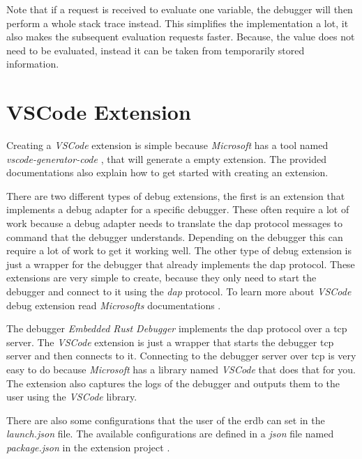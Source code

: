 Note that if a request is received to evaluate one variable, the debugger will then perform a whole stack trace instead.
This simplifies the implementation a lot, it also makes the subsequent evaluation requests faster.
Because, the value does not need to be evaluated, instead it can be taken from temporarily stored information.



\section{VSCode Extension}
Creating a \emph{VSCode} extension is simple because \emph{Microsoft} has a tool named \emph{vscode-generator-code} \cite{vscode-generator-code}, that will generate a empty extension.
The provided documentations also explain how to get started with creating an extension.


There are two different types of debug extensions, the first is an extension that implements a debug adapter for a specific debugger.
These often require a lot of work because a debug adapter needs to translate the \gls{dap} protocol messages to command that the debugger understands.
Depending on the debugger this can require a lot of work to get it working well.
The other type of debug extension is just a wrapper for the debugger that already implements the \gls{dap} protocol.
These extensions are very simple to create, because they only need to start the debugger and connect to it using the \emph{dap} protocol.
To learn more about \emph{VSCode} debug extension read \emph{Microsofts} documentations \cite{vscode-debugger-extension-doc}.


The debugger \emph{Embedded Rust Debugger} implements the \gls{dap} protocol over a \gls{tcp} server.
The \emph{VSCode} extension is just a wrapper that starts the debugger \gls{tcp} server and then connects to it.
Connecting to the debugger server over \gls{tcp} is very easy to do because \emph{Microsoft} has a library named \emph{VSCode} that does that for you.
The extension also captures the logs of the debugger and outputs them to the user using the \emph{VSCode} library.


There are also some configurations that the user of the \gls{erdb} can set in the \emph{launch.json} file.
The available configurations are defined in a \emph{json} file named \emph{package.json} in the extension project \cite{erdb-vscode}.
